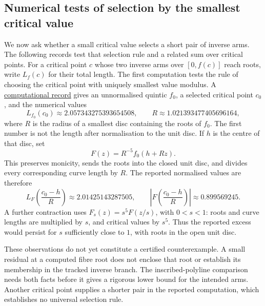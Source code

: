 \documentclass[11pt]{article}
\begin{document}
\subsection*{Numerical tests of selection by the smallest critical value}

We now ask whether a small critical value selects a short pair of
inverse arms. The following records test that selection rule and a
related sum over critical points. For a critical point $c$ whose two
inverse arms over $[0,f(c)]$ reach roots, write $L_f(c)$ for their total
length.
The first computation tests the rule of choosing the critical point
with uniquely smallest value modulus. A
\href{https://github.com/wcook04/plectis-erdos/blob/f214a6b45528dc5eefe20ffadc35f2e981627d4c/research_corpus/Erdos1041/MinimalHubArmBudgetRefutation.md}{computational record}
gives an unnormalised
quintic $f_0$, a selected critical point $c_0$, and the numerical values
\[
 L_{f_0}(c_0)\approx2.057343275393654508,
 \qquad R\approx1.021393477405696164,
\]
where $R$ is the radius of a smallest disc containing the roots of $f_0$.
The first number is not the length after normalisation to the unit disc.
If $h$ is the centre of that disc, set
\[
 F(z)=R^{-5}f_0(h+Rz).
\]
This preserves monicity, sends the roots into the closed unit disc,
and divides every corresponding curve length by $R$. The reported
normalised values are therefore
\[
 L_F\!\left(\frac{c_0-h}{R}\right)\approx2.01425143287505,
 \qquad
 \left|F\!\left(\frac{c_0-h}{R}\right)\right|
 \approx0.899569245.
\]
A further contraction uses $F_s(z)=s^5F(z/s)$, with $0<s<1$: roots and
curve lengths are multiplied by $s$, and critical values by $s^5$.
Thus the reported excess would persist for $s$ sufficiently close to $1$,
with roots in the open unit disc.

These observations do not yet constitute a certified counterexample. A small
residual at a computed fibre root does not enclose that root or establish
its membership in the tracked inverse branch. The inscribed-polyline
comparison needs both facts before it gives a rigorous lower bound for
the intended arms. Another critical point supplies a shorter pair in the reported
computation, which establishes no universal selection rule.
\end{document}
